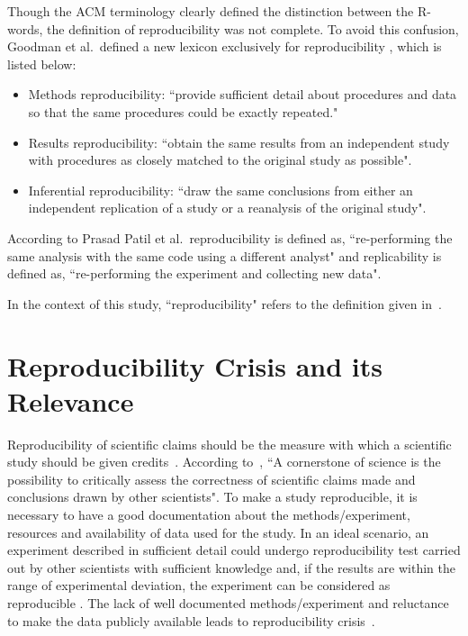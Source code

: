Though the ACM terminology clearly defined the distinction between the R-words, the definition of reproducibility was not complete. To avoid this confusion, Goodman et al.\, defined a new lexicon exclusively for reproducibility \cite{Goodman2016}, which is listed below:

\begin{itemize}
\item {Methods reproducibility: ``provide sufficient detail about procedures and data so that the same procedures could be exactly repeated."}
\item {Results reproducibility: ``obtain the same results from an independent study with procedures as closely matched to the original study as possible".}
\item {Inferential reproducibility: ``draw the same conclusions from either an independent replication of a study or a reanalysis of the original study".}
\end{itemize}

According to Prasad Patil et al.\, reproducibility is defined as, ``re-performing the same analysis with the same code using a different analyst" and replicability is defined as, ``re-performing the experiment and collecting new data".

In the context of this study, ``reproducibility" refers to the definition given in~\cite{Patil2016}. 

\section{Reproducibility Crisis and its Relevance}
Reproducibility of scientific claims should be the measure with which a scientific study should be given credits~\cite{aac4716}. According to~\cite{Plesser2018}, ``A cornerstone of science is the possibility to critically assess the correctness of scientific claims made and conclusions drawn by other scientists".
To make a study reproducible, it is necessary to have a good documentation about the methods/experiment, resources and availability of data used for the study. In an ideal scenario, an experiment described in sufficient detail could undergo reproducibility test carried out by other scientists with sufficient knowledge and, if the results are within the range of experimental deviation, the experiment can be considered as reproducible \cite{Plesser2018}. The lack of well documented methods/experiment and reluctance to make the data publicly available leads to reproducibility crisis~\cite{Baker2016}.

